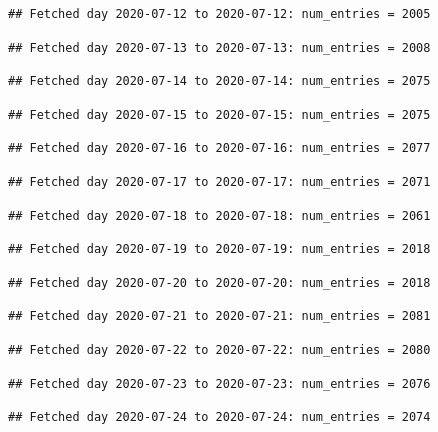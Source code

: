 \documentclass[]{article}
\begin{document}
\begin{verbatim}
## Fetched day 2020-07-12 to 2020-07-12: num_entries = 2005
\end{verbatim}

\begin{verbatim}
## Fetched day 2020-07-13 to 2020-07-13: num_entries = 2008
\end{verbatim}

\begin{verbatim}
## Fetched day 2020-07-14 to 2020-07-14: num_entries = 2075
\end{verbatim}

\begin{verbatim}
## Fetched day 2020-07-15 to 2020-07-15: num_entries = 2075
\end{verbatim}

\begin{verbatim}
## Fetched day 2020-07-16 to 2020-07-16: num_entries = 2077
\end{verbatim}

\begin{verbatim}
## Fetched day 2020-07-17 to 2020-07-17: num_entries = 2071
\end{verbatim}

\begin{verbatim}
## Fetched day 2020-07-18 to 2020-07-18: num_entries = 2061
\end{verbatim}

\begin{verbatim}
## Fetched day 2020-07-19 to 2020-07-19: num_entries = 2018
\end{verbatim}

\begin{verbatim}
## Fetched day 2020-07-20 to 2020-07-20: num_entries = 2018
\end{verbatim}

\begin{verbatim}
## Fetched day 2020-07-21 to 2020-07-21: num_entries = 2081
\end{verbatim}

\begin{verbatim}
## Fetched day 2020-07-22 to 2020-07-22: num_entries = 2080
\end{verbatim}

\begin{verbatim}
## Fetched day 2020-07-23 to 2020-07-23: num_entries = 2076
\end{verbatim}

\begin{verbatim}
## Fetched day 2020-07-24 to 2020-07-24: num_entries = 2074
\end{verbatim}
\end{document}
